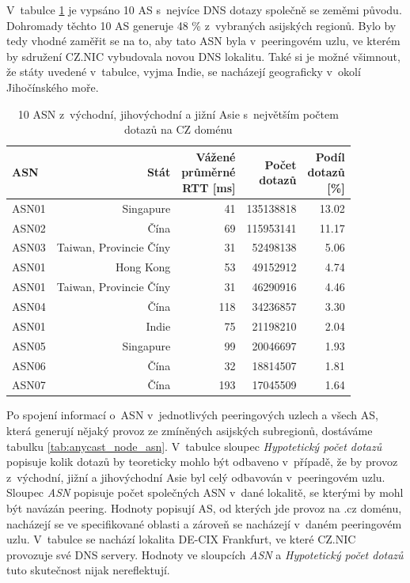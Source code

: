 \documentclass[thesis=M,czech]{src/FITthesis}[2019/12/23]
\begin{document}
V~tabulce \ref{tab:anycast_asia_asn} je vypsáno 10 AS s~nejvíce DNS dotazy společně se zeměmi původu. Dohromady těchto 10 AS generuje 48 \% z~vybraných asijských regionů. Bylo by tedy vhodné zaměřit se na to, aby tato ASN byla v~peeringovém uzlu, ve kterém by sdružení CZ.NIC vybudovala novou DNS lokalitu. Také si je možné všimnout, že státy uvedené v~tabulce, vyjma Indie, se nacházejí geograficky v~okolí Jihočínského moře.

\begin{table}
\centering
\begin{tabular}{lrrrr}
\toprule
     ASN  &  Stát  &  \makecell{Vážené\\průměrné\\RTT [ms]} &  \makecell{Počet\\dotazů} &  \makecell{Podíl\\dotazů\\\ [\%]} \\
\midrule
ASN01  &                  Singapure &  41 &   135138818 &       13.02 \\ 
ASN02   &                      Čína &  69 &   115953141 &      11.17 \\ 
ASN03   &  Taiwan, Provincie Číny &  31 &    52498138 &       5.06 \\ 
ASN01  &                  Hong Kong &  53 &    49152912 &        4.74 \\ 
ASN01  &  Taiwan, Provincie Číny &  31 &    46290916 &        4.46 \\ 
ASN04   &                      Čína & 118 &    34236857 &       3.30 \\ 
ASN01   &                      Indie &  75 &    21198210 &       2.04 \\ 
ASN05 &                  Singapure &  99 &    20046697 &         1.93 \\ 
ASN06   &                      Čína &  32 &    18814507 &       1.81 \\ 
ASN07   &                      Čína & 193 &    17045509 &       1.64 \\

\bottomrule
\end{tabular}
 	\caption[]{10 ASN z~východní, jihovýchodní a jižní Asie s~největším počtem dotazů na CZ doménu} 
 	\label{tab:anycast_asia_asn}
\end{table}


Po spojení informací o~ASN v~jednotlivých peeringových uzlech a všech AS, která generují nějaký provoz ze zmíněných asijských subregionů, dostáváme tabulku \ref{tab:anycast_node_asn}. V~tabulce sloupec \textit{Hypotetický počet dotazů} popisuje kolik dotazů by teoreticky mohlo být odbaveno v~případě, že by provoz z~východní, jižní a jihovýchodní Asie byl celý odbavován v~peeringovém uzlu. Sloupec \textit{ASN} popisuje počet společných ASN v~dané lokalitě, se kterými by mohl být navázán peering. Hodnoty popisují AS, od kterých jde provoz na .cz doménu, nacházejí se ve specifikované oblasti a zároveň se nacházejí v~daném peeringovém uzlu. V~tabulce se nachází lokalita DE-CIX Frankfurt, ve které CZ.NIC provozuje své DNS servery. Hodnoty ve sloupcích \textit{ASN} a \textit{Hypotetický počet dotazů} tuto skutečnost nijak nereflektují. 
\end{document}
